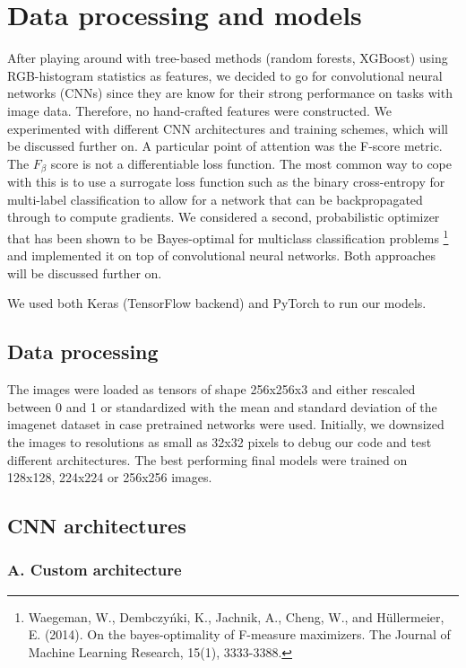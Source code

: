 \documentclass[fleqn]{homework}
\begin{document}
\section{Data processing and models}
After playing around with tree-based methods (random forests, XGBoost) using RGB-histogram statistics as features, we decided to go for convolutional neural networks (CNNs) since they are know for their strong performance on tasks with image data. Therefore, no hand-crafted features were constructed. We experimented with different CNN architectures and training schemes, which will be discussed further on. A particular point of attention was the F-score metric. The $F_{\beta}$ score is not a differentiable loss function. The most common way to cope with this is to use a surrogate loss function such as the binary cross-entropy for multi-label classification to allow for a network that can be backpropagated through to compute gradients. We considered a second, probabilistic optimizer that has been shown to be Bayes-optimal for multiclass classification problems \footnote{Waegeman, W., Dembczyńki, K., Jachnik, A., Cheng, W., and Hüllermeier, E. (2014). On the bayes-optimality of F-measure maximizers. The Journal of Machine Learning Research, 15(1), 3333-3388.} and implemented it on top of convolutional neural networks. Both approaches will be discussed further on.

We used both Keras (TensorFlow backend) and PyTorch to run our models.

\subsection*{Data processing}

The images were loaded as tensors of shape 256x256x3 and either rescaled between 0 and 1 or standardized with the mean and standard deviation of the imagenet dataset in case pretrained networks were used. Initially, we downsized the images to resolutions as small as 32x32 pixels to debug our code and test different architectures. The best performing final models were trained on 128x128, 224x224 or 256x256 images. 
\subsection*{CNN architectures}
\subsubsection*{A. Custom architecture}
\end{document}
